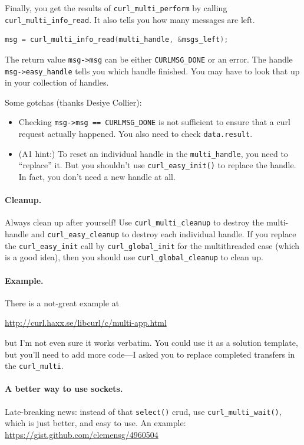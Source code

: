 Finally, you get the results of {\tt curl\_multi\_perform} by calling
{\tt curl\_multi\_info\_read}. It also tells you how many messages are left.
\begin{lstlisting}[language=C]
  msg = curl_multi_info_read(multi_handle, &msgs_left);
\end{lstlisting}
The return value \verb+msg->msg+ can be either {\tt CURLMSG\_DONE} or an error.
The handle \verb+msg->easy_handle+ tells you which handle finished. You may have
to look that up in your collection of handles.

Some gotchas (thanks Desiye Collier):
\begin{itemize}
\item Checking \verb+msg->msg == CURLMSG_DONE+ is not sufficient to ensure that a curl request actually happened. You also need to check {\tt data.result}.
\item (A1 hint:) To reset an individual handle in the {\tt multi\_handle}, you need to ``replace'' it. But you shouldn't use {\tt curl\_easy\_init()} to replace the handle.  In fact, you don't need a new handle at all.
\end{itemize}

\paragraph{Cleanup.} Always clean up after yourself! Use {\tt curl\_multi\_cleanup}
to destroy the multi-handle and {\tt curl\_easy\_cleanup} to destroy each individual handle. If you replace the {\tt curl\_easy\_init} call by {\tt curl\_global\_init} for the multithreaded case (which is a good idea), then you should use {\tt curl\_global\_cleanup} to clean up.

\paragraph{Example.}
There is a not-great example at 
\begin{center}
\url{http://curl.haxx.se/libcurl/c/multi-app.html}
\end{center}
but I'm not even sure it works verbatim. You could use it as a solution template,
but you'll need to add more code---I asked you to replace completed transfers in the
{\tt curl\_multi}.

\paragraph{A better way to use sockets.} Late-breaking news: instead
of that {\tt select()} crud, use {\tt curl\_multi\_wait()}, which is
just better, and easy to use. An example:
\url{https://gist.github.com/clemensg/4960504}


